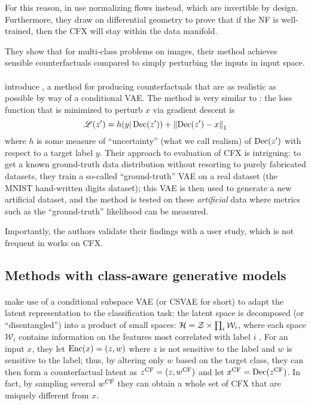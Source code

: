 \documentclass[../main.tex]{subfiles}
\begin{document}
For this reason, in \cite{dombrowskiDiffeomorphic2021} \citeauthor{dombrowskiDiffeomorphic2021} use normalizing flows instead, which are invertible by design.
Furthermore, they draw on differential geometry to prove that if the NF is well-trained, then the CFX will stay within the data manifold.

They show that for multi-class problems on images, their method achieves sensible counterfactuals compared to simply perturbing the inputs in input space.

\paragraph{}

\citeauthor{antoranGetting2021} introduce  \cite{antoranGetting2021}, a method for producing counterfactuals that are as realistic as possible by way of a conditional VAE. The method is very similar to \revise: the loss function that is minimized to perturb $x$ via gradient descent is
\begin{equation}
    \mathscr{L}(z') = h(y | \operatorname{Dec}(z')) + \left\lVert\operatorname{Dec}(z') - x\right\rVert_1
\end{equation}
where $h$ is some measure of ``uncertainty'' (what we call realism) of $\operatorname{Dec}(z')$ with respect to a target label $y$.
Their approach to evaluation of CFX is intriguing:
to get a known ground-truth data distribution without resorting to purely
fabricated datasets, they train a so-called ``ground-truth'' VAE on a real dataset (the MNIST hand-written digits dataset);
this VAE is then used to generate a new artificial dataset, and the method is tested on these \emph{artificial} data where
metrics such as the ``ground-truth'' likelihood can be measured.

Importantly, the authors validate their findings with a user study, which is not frequent in works on CFX.

\subsection{Methods with class-aware generative models}

\paragraph{}

\citeauthor{downsCRUDS2020} make use of a conditional subspace VAE (or CSVAE for short) to adapt the latent representation to the classification task:
the latent space is decomposed (or ``disentangled'') into a product of small spaces: $\mathcal{H} = \mathcal{Z} \times \prod_{i} \mathcal{W}_i$, where each space $\mathcal{W}_i$ contains information on the features most correlated with label $i$ \cite{klysLearning2018}.
For an input $x$, they let $\operatorname{Enc}(x) = (z, w)$ where $z$ is not sensitive to the label and $w$ is sensitive to the label; thus, by altering only $w$ based on the target class, they can then form a counterfactual latent as $z^\mathrm{CF} = (z, w^\mathrm{CF})$ and let $x^\mathrm{CF} = \operatorname{Dec}(z^\mathrm{CF})$.
In fact, by sampling several $w^\mathrm{CF}$ they can obtain a whole set of CFX that are uniquely different from $x$.
\end{document}
